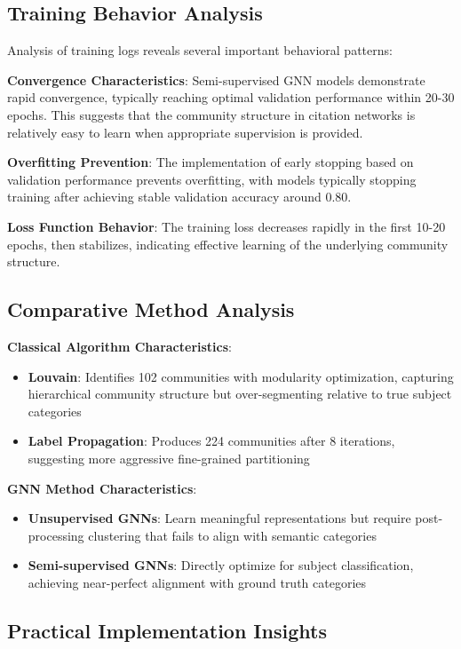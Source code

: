 \documentclass[conference]{IEEEtran}
\begin{document}
\subsection{Training Behavior Analysis}

Analysis of training logs reveals several important behavioral patterns:

\textbf{Convergence Characteristics}: Semi-supervised GNN models demonstrate rapid convergence, typically reaching optimal validation performance within 20-30 epochs. This suggests that the community structure in citation networks is relatively easy to learn when appropriate supervision is provided.

\textbf{Overfitting Prevention}: The implementation of early stopping based on validation performance prevents overfitting, with models typically stopping training after achieving stable validation accuracy around 0.80.

\textbf{Loss Function Behavior}: The training loss decreases rapidly in the first 10-20 epochs, then stabilizes, indicating effective learning of the underlying community structure.

\subsection{Comparative Method Analysis}

\textbf{Classical Algorithm Characteristics}:
\begin{itemize}
    \item \textbf{Louvain}: Identifies 102 communities with modularity optimization, capturing hierarchical community structure but over-segmenting relative to true subject categories
    \item \textbf{Label Propagation}: Produces 224 communities after 8 iterations, suggesting more aggressive fine-grained partitioning
\end{itemize}

\textbf{GNN Method Characteristics}:
\begin{itemize}
    \item \textbf{Unsupervised GNNs}: Learn meaningful representations but require post-processing clustering that fails to align with semantic categories
    \item \textbf{Semi-supervised GNNs}: Directly optimize for subject classification, achieving near-perfect alignment with ground truth categories
\end{itemize}

\subsection{Practical Implementation Insights}
\end{document}

